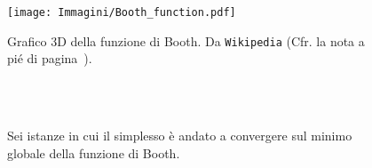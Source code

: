 \vfill

\begin{figure}[h!]
	\centering
	\texttt{[image: Immagini/Booth\_function.pdf]}
	\caption{Grafico 3D della funzione di Booth. Da \texttt{Wikipedia} (Cfr. la nota a pié di pagina~\pageref{WikipediaFootnote}).}
	\label{fig:BoothPlot}
\end{figure}

\vfill

\begin{figure}
	\centering
		\caption{Sei istanze in cui il simplesso è andato a convergere sul minimo globale della funzione di Booth.}
	\\
	 \\

\end{figure}

